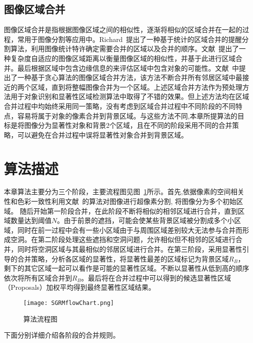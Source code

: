 \subsection{图像区域合并}
\label{sec:regionMerging}
图像区域合并是指根据图像区域之间的相似性，逐渐将相似的区域合并在一起的过程，常用于图像分割等应用中。Richard~\cite{Richard2004Statistical}提出了一种基于统计的区域合并的提醒分割算法，利用图像统计特许确定需要合并的区域以及合并的顺序。文献~提出了一种复杂度自适应的图像区域距离以衡量图像区域的相似性，并基于此进行区域合并。最后根据区域中包含边缘信息的来评估区域中包含对象的可能性。文献~中提出了一种基于贪心算法的图像区域合并方法，该方法不断合并所有邻居区域中最接近的两个区域，直到将整幅图像合并为一个区域。上述区域合并方法作为预处理方法用于对象识别和显著性区域检测算法中取得了不错的效果。但上述方法均在区域合并过程中均始终采用同一策略，没有考虑到区域合并过程中不同阶段的不同特点，容易将属于对象的像素合并到背景区域。与这些方法不同,本章所提算法的目标是将图像分为显著性对象和背景2个区域，且在不同的阶段采用不同的合并策略，可以避免在合并过程中误将显著性对象合并到背景区域。

\section{算法描述}
\label{sec:algorithm}
本章算法主要分为三个阶段，主要流程图见图~\ref{fig:algflow}所示。首先,依据像素的空间相关性和色彩一致性利用文献~的算法对图像进行超像素分割, 将图像分为多个初始区域。 随后开始第一阶段合并，在此阶段不断将相似的相邻区域进行合并，直到区域数量达到阈值$N$。由于前景的遮挡，可能会使某些背景区域被分割成多个小区域，同时在前一过程中会有一些小区域由于与周围区域差别较大无法参与合并而形成空洞。在第二阶段处理这些遮挡和空洞问题，允许相似但不相邻的区域进行合并，同时将空洞区域与其最相似的邻居区域进行合并。在第三阶段，采用显著性引导的合并策略，分析各区域的显著性，将显著性最差的区域标记为背景区域$R_{B}$，剩下的其它区域一起可以看作是可能的显著性区域。不断以显著性从低到高的顺序依次将所有区域合并到$R_{B}$。最后将在合并过程中可以得到的候选显著性区域（Proposals）加权平均得到最终显著性区域结果。\par
\begin{figure}[h]
  \centering%
      {\texttt{[image: SGRMflowChart.png]}}

  \caption{算法流程图}
  \label{fig:algflow}
\end{figure}

\par
下面分别详细介绍各阶段的合并规则。


